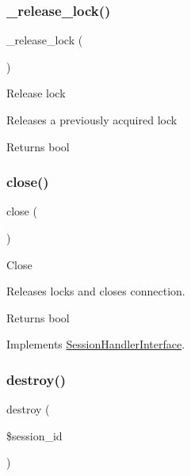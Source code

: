 \subsubsection{\texorpdfstring{\+\_\+release\+\_\+lock()}{\_release\_lock()}}
{\footnotesize\ttfamily \+\_\+release\+\_\+lock (\begin{DoxyParamCaption}{ }\end{DoxyParamCaption})\hspace{0.3cm}{\ttfamily [protected]}}

Release lock

Releases a previously acquired lock

\begin{DoxyReturn}{Returns}
bool 
\end{DoxyReturn}
\mbox{\label{class_c_i___session__memcached__driver_aa69c8bf1f1dcf4e72552efff1fe3e87e}} 
\subsubsection{\texorpdfstring{close()}{close()}}
{\footnotesize\ttfamily close (\begin{DoxyParamCaption}{ }\end{DoxyParamCaption})}

Close

Releases locks and closes connection.

\begin{DoxyReturn}{Returns}
bool 
\end{DoxyReturn}


Implements \mbox{\hyperlink{interface_session_handler_interface_aa69c8bf1f1dcf4e72552efff1fe3e87e}{Session\+Handler\+Interface}}.

\mbox{\label{class_c_i___session__memcached__driver_aaec5812f6b4eb6835f88d3baa06a002a}} 
\subsubsection{\texorpdfstring{destroy()}{destroy()}}
{\footnotesize\ttfamily destroy (\begin{DoxyParamCaption}\item[{}]{\$session\+\_\+id }\end{DoxyParamCaption})}

